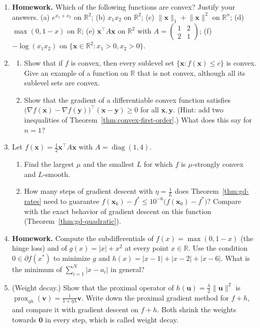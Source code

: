 \documentclass[11pt]{article}
\newcommand{\homework}{\textcolor{red!70!black}{\textbf{Homework.}}}
\newcommand{\norm}[1]{\lVert #1 \rVert}
\theoremstyle{definition}
\theoremstyle{plain}
\theoremstyle{remark}
\DeclareMathOperator{\diag}{diag}
\begin{document}
\begin{enumerate}[leftmargin=*]
\begin{enumerate}[label=(\alph*)]
    \end{enumerate}
    \item \homework{} Which of the following functions are convex? Justify your answers. (a) $e^{x_1 + x_2}$ on $\mathbb{R}^2$; (b) $x_1 x_2$ on $\mathbb{R}^2$; (c) $\norm{\mathbf{x}}_1 + \norm{\mathbf{x}}^2$ on $\mathbb{R}^n$; (d) $\max(0, 1 - x)$ on $\mathbb{R}$; (e) $\mathbf{x}^\top A\mathbf{x}$ on $\mathbb{R}^2$ with $A = \begin{pmatrix} 1 & 2 \\ 2 & 1 \end{pmatrix}$; (f) $-\log(x_1 x_2)$ on $\{\mathbf{x} \in \mathbb{R}^2 : x_1 > 0, x_2 > 0\}$.
    \item \begin{enumerate}[label=(\alph*)]
        \item Show that if $f$ is convex, then every sublevel set $\{\mathbf{x} : f(\mathbf{x}) \leq c\}$ is convex. Give an example of a function on $\mathbb{R}$ that is not convex, although all its sublevel sets are convex.
        \item Show that the gradient of a differentiable convex function satisfies $\big(\nabla f(\mathbf{x}) - \nabla f(\mathbf{y})\big)^\top(\mathbf{x} - \mathbf{y}) \geq 0$ for all $\mathbf{x}, \mathbf{y}$. (Hint: add two inequalities of Theorem~\ref{thm:convex-first-order}.) What does this say for $n = 1$?
    \end{enumerate}
    \item Let $f(\mathbf{x}) = \frac{1}{2}\mathbf{x}^\top A\mathbf{x}$ with $A = \diag(1, 4)$.
    \begin{enumerate}[label=(\alph*)]
        \item Find the largest $\mu$ and the smallest $L$ for which $f$ is $\mu$-strongly convex and $L$-smooth.
        \item How many steps of gradient descent with $\eta = \frac{1}{L}$ does Theorem~\ref{thm:gd-rates} need to guarantee $f(\mathbf{x}_k) - f^* \leq 10^{-6}\big(f(\mathbf{x}_0) - f^*\big)$? Compare with the exact behavior of gradient descent on this function (Theorem~\ref{thm:gd-quadratic}).
    \end{enumerate}
    \item \homework{} Compute the subdifferentials of $f(x) = \max(0, 1 - x)$ (the hinge loss) and of $g(x) = |x| + x^2$ at every point $x \in \mathbb{R}$. Use the condition $0 \in \partial f(x^*)$ to minimize $g$ and $h(x) = |x - 1| + |x - 2| + |x - 6|$. What is the minimum of $\sum_{i=1}^N |x - a_i|$ in general?
    \item (Weight decay.) Show that the proximal operator of $h(\mathbf{u}) = \frac{\lambda}{2}\norm{\mathbf{u}}^2$ is $\operatorname{prox}_{\eta h}(\mathbf{v}) = \frac{1}{1 + \eta\lambda}\mathbf{v}$. Write down the proximal gradient method for $f + h$, and compare it with gradient descent on $f + h$. Both shrink the weights towards $\mathbf{0}$ in every step, which is called weight decay.

\end{enumerate}
\end{document}
